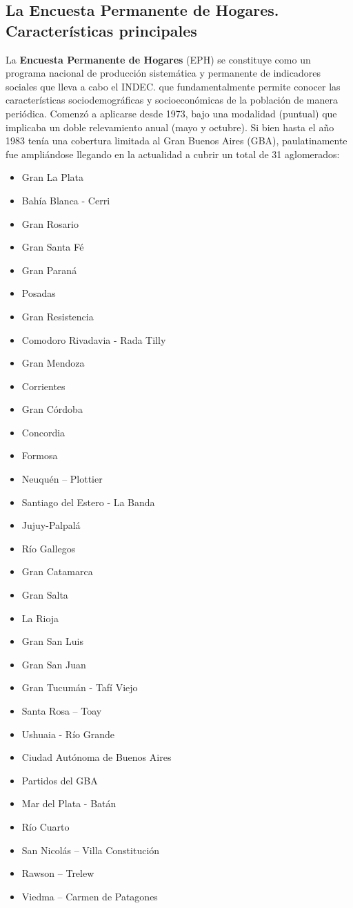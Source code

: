 \documentclass[
]{article}
\providecommand{\tightlist}{%
  \setlength{\itemsep}{0pt}\setlength{\parskip}{0pt}}
\begin{document}
\hypertarget{eph1}{%
\subsection{La Encuesta Permanente de Hogares. Características principales}\label{eph1}}

La \textbf{Encuesta Permanente de Hogares} (EPH) se constituye como un programa nacional de producción sistemática y permanente de indicadores sociales que lleva a cabo el INDEC. que fundamentalmente permite conocer las características sociodemográficas y socioeconómicas de la población de manera periódica. Comenzó a aplicarse desde 1973, bajo una modalidad (puntual) que implicaba un doble relevamiento anual (mayo y octubre). Si bien hasta el año 1983 tenía una cobertura limitada al Gran Buenos Aires (GBA), paulatinamente fue ampliándose llegando en la actualidad a cubrir un total de 31 aglomerados:

\begin{itemize}
\tightlist
\item
  Gran La Plata
\item
  Bahía Blanca - Cerri
\item
  Gran Rosario
\item
  Gran Santa Fé
\item
  Gran Paraná
\item
  Posadas
\item
  Gran Resistencia
\item
  Comodoro Rivadavia - Rada Tilly
\item
  Gran Mendoza
\item
  Corrientes
\item
  Gran Córdoba
\item
  Concordia
\item
  Formosa
\item
  Neuquén -- Plottier
\item
  Santiago del Estero - La Banda
\item
  Jujuy-Palpalá
\item
  Río Gallegos
\item
  Gran Catamarca
\item
  Gran Salta
\item
  La Rioja
\item
  Gran San Luis
\item
  Gran San Juan
\item
  Gran Tucumán - Tafí Viejo
\item
  Santa Rosa -- Toay
\item
  Ushuaia - Río Grande
\item
  Ciudad Autónoma de Buenos Aires
\item
  Partidos del GBA
\item
  Mar del Plata - Batán
\item
  Río Cuarto
\item
  San Nicolás -- Villa Constitución
\item
  Rawson -- Trelew
\item
  Viedma -- Carmen de Patagones
\end{itemize}
\end{document}
